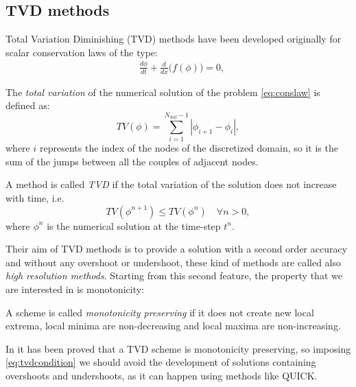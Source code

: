 \subsection{TVD methods} \label{subsec:tvd}
Total Variation Diminishing (TVD) methods have been developed originally for 
scalar conservation laws of the type:
\begin{align}
	\label{eq:conslaw} &\frac{d\phi}{dt} + \frac{d}{dx}\big(f(\phi)\big) = 0, 
\end{align}

\begin{defn}
	The \emph{total variation} of the numerical solution of the problem 
	\eqref{eq:conslaw} is defined as:
	\begin{equation}
		TV(\phi) = \sum_{i=1}^{N_\text{dof}-1} |\phi_{i+1} - \phi_i|,
	\end{equation}
	where $i$ represents the index of the nodes of the discretized domain, so 
	it is the sum of the jumps between all the couples of adjacent nodes.
\end{defn}
\begin{defn}
	A method is called \emph{TVD} if the total variation of the solution does 
	not increase with time, i.e. 
	\begin{equation}\label{eq:tvdcondition}
	TV(\phi ^{n+1}) \leq TV(\phi^n) \quad \forall n>0,
	\end{equation}
	where $\phi^n$ is the numerical solution at the time-step $t^n$.
\end{defn}

Their aim of TVD methods is to provide a solution with a second order accuracy 
and without any overshoot or undershoot, these kind of methods are called also 
\emph{high resolution methods}. Starting from this second feature, the 
property 
that we are interested in is monotonicity:
\begin{defn}
	A scheme is called \emph{monotonicity preserving} if it does not create new 
	local extrema, local minima are non-decreasing and local maxima are 
	non-increasing.
\end{defn}
In \cite{tvd:monotonicity} it has been proved that a TVD scheme is 
monotonicity 
preserving, so imposing \eqref{eq:tvdcondition} we should avoid the 
development 
of solutions containing overshoots and undershoots, as it can happen using 
methods like QUICK.

